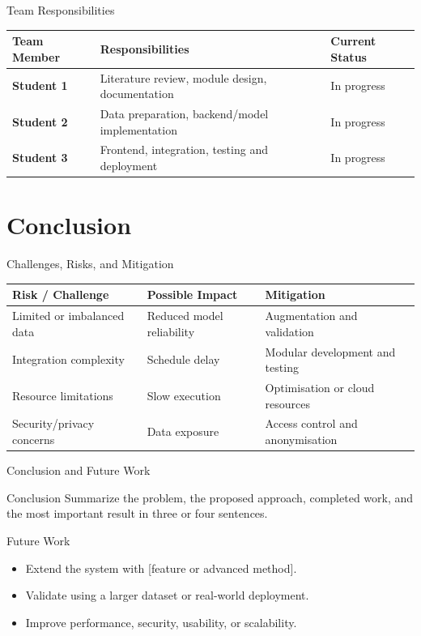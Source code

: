\documentclass[aspectratio=169,11pt]{beamer}
\begin{document}
\begin{frame}{Team Responsibilities}
  \small
  \begin{tabularx}{\textwidth}{>{\bfseries}p{3.3cm}X p{2.3cm}}
    \toprule
    Team Member & Responsibilities & Current Status \\
    \midrule
    Student 1 & Literature review, module design, documentation & In progress \\
    Student 2 & Data preparation, backend/model implementation & In progress \\
    Student 3 & Frontend, integration, testing and deployment & In progress \\
    \bottomrule
  \end{tabularx}
\end{frame}

\section{Conclusion}

\begin{frame}{Challenges, Risks, and Mitigation}
  \small
  \begin{tabularx}{\textwidth}{X X X}
    \toprule
    \textbf{Risk / Challenge} & \textbf{Possible Impact} & \textbf{Mitigation} \\
    \midrule
    Limited or imbalanced data & Reduced model reliability & Augmentation and validation \\
    Integration complexity & Schedule delay & Modular development and testing \\
    Resource limitations & Slow execution & Optimisation or cloud resources \\
    Security/privacy concerns & Data exposure & Access control and anonymisation \\
    \bottomrule
  \end{tabularx}
\end{frame}

\begin{frame}{Conclusion and Future Work}
  \begin{block}{Conclusion}
    Summarize the problem, the proposed approach, completed work, and the most
    important result in three or four sentences.
  \end{block}
  \begin{block}{Future Work}
    \begin{itemize}
      \item Extend the system with [feature or advanced method].
      \item Validate using a larger dataset or real-world deployment.
      \item Improve performance, security, usability, or scalability.
    \end{itemize}
  \end{block}
\end{frame}
\end{document}

